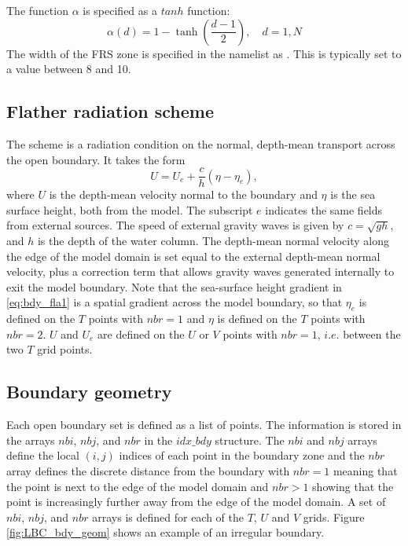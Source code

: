 \documentclass[../tex_main/NEMO_manual]{subfiles}
\begin{document}
The function $\alpha$ is specified as a $tanh$ function:
\begin{equation}  \label{eq:bdy_frs4}
\alpha(d) = 1 - \tanh\left(\frac{d-1}{2}\right),       \quad d=1,N
\end{equation}
The width of the FRS zone is specified in the namelist as 
. This is typically set to a value between 8 and 10. 

\subsection{Flather radiation scheme}
\label{subsec:BDY_flather_scheme}

The \citet{Flather_JPO94} scheme is a radiation condition on the normal, depth-mean
transport across the open boundary. It takes the form
\begin{equation}  \label{eq:bdy_fla1}
U = U_{e} + \frac{c}{h}\left(\eta - \eta_{e}\right),
\end{equation}
where $U$ is the depth-mean velocity normal to the boundary and $\eta$
is the sea surface height, both from the model. The subscript $e$
indicates the same fields from external sources. The speed of external
gravity waves is given by $c = \sqrt{gh}$, and $h$ is the depth of the
water column. The depth-mean normal velocity along the edge of the
model domain is set equal to the
external depth-mean normal velocity, plus a correction term that
allows gravity waves generated internally to exit the model boundary.
Note that the sea-surface height gradient in \autoref{eq:bdy_fla1}
is a spatial gradient across the model boundary, so that $\eta_{e}$ is
defined on the $T$ points with $nbr=1$ and $\eta$ is defined on the
$T$ points with $nbr=2$. $U$ and $U_{e}$ are defined on the $U$ or
$V$ points with $nbr=1$, $i.e.$ between the two $T$ grid points.

\subsection{Boundary geometry}
\label{subsec:BDY_geometry}

Each open boundary set is defined as a list of points. The information
is stored in the arrays $nbi$, $nbj$, and $nbr$ in the $idx\_bdy$
structure.  The $nbi$ and $nbj$ arrays
define the local $(i,j)$ indices of each point in the boundary zone
and the $nbr$ array defines the discrete distance from the boundary
with $nbr=1$ meaning that the point is next to the edge of the
model domain and $nbr>1$ showing that the point is increasingly
further away from the edge of the model domain. A set of $nbi$, $nbj$,
and $nbr$ arrays is defined for each of the $T$, $U$ and $V$
grids. Figure \autoref{fig:LBC_bdy_geom} shows an example of an irregular
boundary. 
\end{document}
